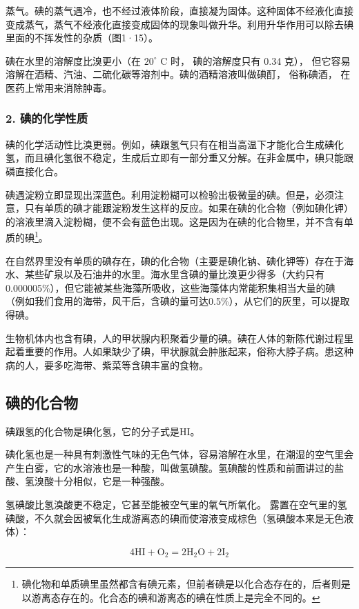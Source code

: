 蒸气。碘的蒸气遇冷，也不经过液体阶段，直接凝为固体。这种固体不经液化直接变成蒸气，蒸气不经液化直接变成固体的现象叫做升华。利用升华作用可以除去碘里面的不挥发性的杂质（图1·15）。

碘在水里的溶解度比溴更小（在 \(20^{\circ}\) C 时， 碘的溶解度只有 0.34
克），
但它容易溶解在酒精、汽油、二硫化碳等溶剂中。碘的酒精溶液叫做碘酊，
俗称碘酒， 在医药上常用来消除肿毒。

\subsubsection{2. 碘的化学性质}

碘的化学活动性比溴更弱。例如，碘跟氢气只有在相当高温下才能化合生成碘化氢，而且碘化氢很不稳定，生成后立即有一部分重又分解。在非金属中，碘只能跟磷直接化合。

碘遇淀粉立即显现出深蓝色。利用淀粉糊可以检验出极微量的碘。但是，必须注意，只有单质的碘才能跟淀粉发生这样的反应。如果在碘的化合物（例如碘化钾）的溶液里滴入淀粉糊，便不会有蓝色出现。这是因为在碘的化合物里，并不含有单质的碘\footnote{碘化物和单质碘里虽然都含有碘元素，但前者碘是以化合态存在的，后者则是以游离态存在的。化合态的碘和游离态的碘在性质上是完全不同的。}。

在自然界里没有单质的碘存在，碘的化合物（主要是碘化钠、碘化钾等）存在于海水、某些矿泉以及石油井的水里。海水里含碘的量比溴更少得多（大约只有0.000005\%），但它能被某些海藻所吸收，这些海藻体内常能积集相当大量的碘（例如我们食用的海带，风干后，含碘的量可达0.5\%），从它们的灰里，可以提取得碘。

生物机体内也含有碘，人的甲状腺内积聚着少量的碘。碘在人体的新陈代谢过程里起着重要的作用。人如果缺少了碘，甲状腺就会肿胀起来，俗称大脖子病。患这种病的人，要多吃海带、紫菜等含碘丰富的食物。

\subsection{碘的化合物}

碘跟氢的化合物是碘化氢，它的分子式是HI。

碘化氢也是一种具有刺激性气味的无色气体，容易溶解在水里，在潮湿的空气里会产生白雾，它的水溶液也是一种酸，叫做氢碘酸。氢碘酸的性质和前面讲过的盐酸、氢溴酸十分相似，它是一种强酸。

氢碘酸比氢溴酸更不稳定，它甚至能被空气里的氧气所氧化。
露置在空气里的氢碘酸，不久就会因被氧化生成游离态的碘而使溶液变成棕色（氢碘酸本来是无色液体）：

\[
4 \mathrm{HI} + \mathrm{O} _ {2} = 2 \mathrm{H} _ {2} \mathrm{O} + 2 \mathrm{I} _ {2}
\]

